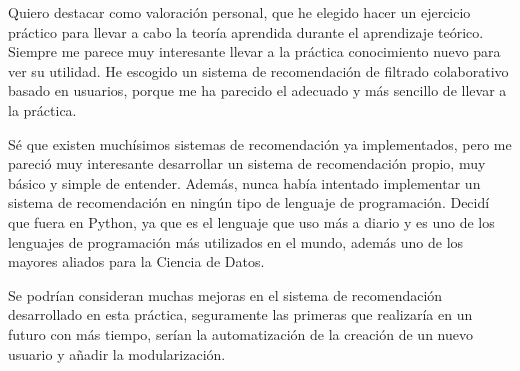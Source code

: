 \documentclass{uimppracticas}
\begin{document}
Quiero destacar como valoración personal, que he elegido hacer un ejercicio práctico para llevar a cabo la teoría aprendida durante el aprendizaje teórico. Siempre me parece muy interesante llevar a la práctica conocimiento nuevo para ver su utilidad. He escogido un sistema de recomendación de filtrado colaborativo basado en usuarios, porque me ha parecido el adecuado y más sencillo de llevar a la práctica. 

Sé que existen muchísimos sistemas de recomendación ya implementados, pero me pareció muy interesante desarrollar un sistema de recomendación propio, muy básico y simple de entender. Además, nunca había intentado implementar un sistema de recomendación en ningún tipo de lenguaje de programación. Decidí que fuera en Python, ya que es el lenguaje que uso más a diario y es uno de los lenguajes de programación más utilizados en el mundo, además uno de los mayores aliados para la Ciencia de Datos. 

Se podrían consideran muchas mejoras en el sistema de recomendación desarrollado en esta práctica, seguramente las primeras que realizaría en un futuro con más tiempo, serían la automatización de la creación de un nuevo usuario y añadir la modularización.

\renewcommand{\refname}{Bibliografía}


	
\end{document}
